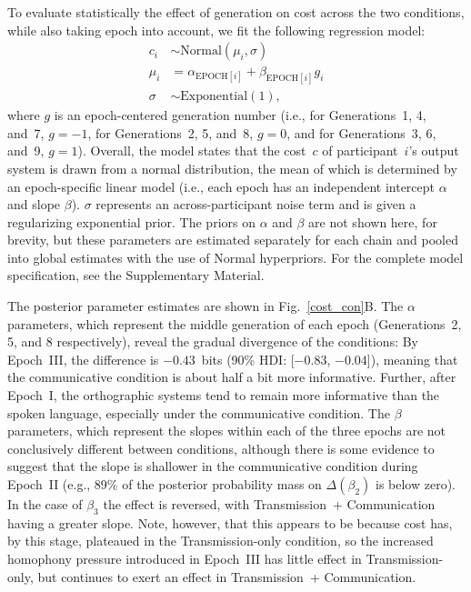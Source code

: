 \documentclass[doc,biblatex]{apa7}
\begin{document}
To evaluate statistically the effect of generation on cost across the two conditions, while also taking epoch into account, we fit the following regression model:
	\begin{equation}
	\begin{aligned}
	   c_i & \sim \mathrm{Normal}(\mu_i, \sigma) \\
	 \mu_i & =    \alpha_{\mathrm{EPOCH}[i]} + \beta_{\mathrm{EPOCH}[i]} g_i \\
	\sigma & \sim \mathrm{Exponential}(1),
	\end{aligned}
	\end{equation}
where $g$ is an epoch-centered generation number (i.e., for Generations~1, 4, and~7, $g=-1$, for Generations~2, 5, and~8, $g=0$, and for Generations~3, 6, and~9, $g=1$). Overall, the model states that the cost~$c$ of participant~$i$'s output system is drawn from a normal distribution, the mean of which is determined by an epoch-specific linear model (i.e., each epoch has an independent intercept $\alpha$ and slope $\beta$). $\sigma$ represents an across-participant noise term and is given a regularizing exponential prior. The priors on $\alpha$ and $\beta$ are not shown here, for brevity, but these parameters are estimated separately for each chain and pooled into global estimates with the use of Normal hyperpriors. For the complete model specification, see the Supplementary Material.

The posterior parameter estimates are shown in Fig.~\ref{cost_con}B. The $\alpha$ parameters, which represent the middle generation of each epoch (Generations~2, 5, and 8 respectively), reveal the gradual divergence of the conditions: By Epoch~III, the difference is $-0.43$~bits (90\% HDI: [$-0.83$, $-0.04$]), meaning that the communicative condition is about half a bit more informative. Further, after Epoch~I, the orthographic systems tend to remain more informative than the spoken language, especially under the communicative condition. The $\beta$ parameters, which represent the slopes within each of the three epochs are not conclusively different between conditions, although there is some evidence to suggest that the slope is shallower in the communicative condition during Epoch~II (e.g., 89\% of the posterior probability mass on $\Delta(\beta_2)$ is below zero). In the case of $\beta_3$ the effect is reversed, with Transmission~+ Communication having a greater slope. Note, however, that this appears to be because cost has, by this stage, plateaued in the Transmission-only condition, so the increased homophony pressure introduced in Epoch~III has little effect in Transmission-only, but continues to exert an effect in Transmission~+ Communication.
\end{document}
